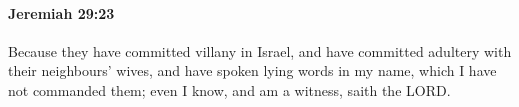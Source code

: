 
		\paragraph{Jeremiah 29:23} %
			\label{JEREMIAH-29-23}

			Because they have committed villany in Israel, and have committed adultery with their neighbours’ wives, and have spoken lying words in my name, which I have not commanded them; even I know, and am a witness, saith the LORD.


